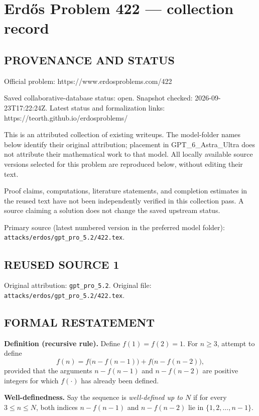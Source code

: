 \section*{Erd\H{o}s Problem 422 --- collection record}

\subsection*{PROVENANCE AND STATUS}
Official problem: https://www.erdosproblems.com/422

Saved collaborative-database status: open.
Snapshot checked: 2026-09-23T17:22:24Z.
Latest status and formalization links: https://teorth.github.io/erdosproblems/

This is an attributed collection of existing writeups. The model-folder names below identify their original attribution; placement in GPT\_6\_Astra\_Ultra does not attribute their mathematical work to that model. All locally available source versions selected for this problem are reproduced below, without editing their text.

Proof claims, computations, literature statements, and completion estimates in the reused text have not been independently verified in this collection pass. A source claiming a solution does not change the saved upstream status.

Primary source (latest numbered version in the preferred model folder): \texttt{attacks/erdos/gpt\_pro\_5.2/422.tex}.

\subsection*{REUSED SOURCE 1}
Original attribution: \texttt{gpt\_pro\_5.2}.
Original file: \texttt{attacks/erdos/gpt\_pro\_5.2/422.tex}.


\subsection*{FORMAL RESTATEMENT}
\textbf{Definition (recursive rule).} Define $f(1)=f(2)=1$. For $n\ge 3$, attempt to define
\[
 f(n) = f\big(n-f(n-1)\big)+f\big(n-f(n-2)\big),
\]
provided that the arguments $n-f(n-1)$ and $n-f(n-2)$ are positive integers for which $f(\cdot)$ has already been defined.

\textbf{Well-definedness.} Say the sequence is \emph{well-defined up to $N$} if for every $3\le n\le N$, both indices $n-f(n-1)$ and $n-f(n-2)$ lie in $\{1,2,\dots,n-1\}$.

